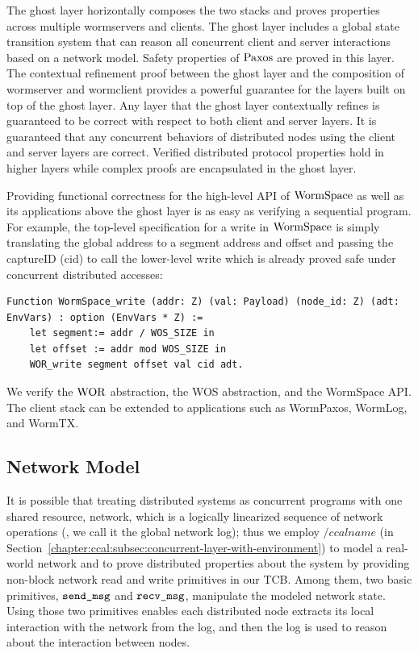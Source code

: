 The ghost layer horizontally composes the two stacks and proves properties across multiple wormservers and clients.
The ghost layer includes a global state transition system that can reason all concurrent client and server interactions based on a network model. 
Safety properties of $\mathrm{Paxos}$ are proved in this layer.
The contextual refinement proof between the ghost layer and the composition of wormserver and wormclient provides a powerful guarantee 
for  the layers built on top of the ghost layer. 
Any layer that the ghost layer contextually refines is guaranteed to be correct with respect to both client and server layers. 
It is guaranteed that any concurrent behaviors of distributed nodes using the client and server layers are correct. 
Verified distributed protocol properties hold in higher layers while complex proofs are encapsulated in the ghost layer.

Providing functional correctness for the high-level API of $\mathrm{WormSpace}$ as well as its applications
above the ghost layer is as easy as verifying a sequential program.
For example, the top-level specification for a write in $\mathrm{WormSpace}$ is simply translating the global address to a segment address and offset and 
passing the captureID (cid) to call the lower-level write which is already proved safe under concurrent distributed accesses:
\begin{lstlisting}
Function WormSpace_write (addr: Z) (val: Payload) (node_id: Z) (adt: EnvVars) : option (EnvVars * Z) :=
    let segment:= addr / WOS_SIZE in 
    let offset := addr mod WOS_SIZE in
    WOR_write segment offset val cid adt.
\end{lstlisting}
 We verify the $\mathrm{WOR}$ abstraction, the WOS abstraction, and the WormSpace API.
 The client stack can be extended to applications such as WormPaxos, WormLog, and WormTX. 

\subsection{Network Model}
\label{subsec:network_modeling}

It is possible that treating distributed systems as concurrent programs with one shared resource, network, which is
a logically linearized sequence of network operations (\ie, we call it the global network log);
thus we employ $/ccalname$ (in Section~\ref{chapter:ccal:subsec:concurrent-layer-with-environment})
to model a real-world network and to prove distributed properties about the system
by providing non-block network read and write primitives in our TCB. 
Among them, two basic primitives, ${\mathrm{\texttt{send\_msg}}}$ and ${\mathrm{\texttt{recv\_msg}}}$, 
manipulate the modeled network state. 
Using those two primitives enables each distributed node  extracts its local interaction with the network from the log, 
and then the log is used to reason about the interaction between nodes.


